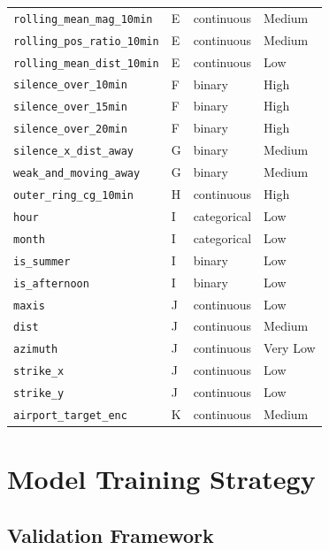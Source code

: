 \documentclass[12pt,a4paper]{article}
\begin{document}
\begin{table}[H]
\begin{tabular}{llll}
\texttt{rolling\_mean\_mag\_10min}  & E & continuous & Medium \\
\texttt{rolling\_pos\_ratio\_10min} & E & continuous & Medium \\
\texttt{rolling\_mean\_dist\_10min} & E & continuous & Low \\
\texttt{silence\_over\_10min}     & F & binary     & High \\
\texttt{silence\_over\_15min}     & F & binary     & High \\
\texttt{silence\_over\_20min}     & F & binary     & High \\
\texttt{silence\_x\_dist\_away}   & G & binary     & Medium \\
\texttt{weak\_and\_moving\_away}  & G & binary     & Medium \\
\texttt{outer\_ring\_cg\_10min}   & H & continuous & High \\
\texttt{hour}                     & I & categorical & Low \\
\texttt{month}                    & I & categorical & Low \\
\texttt{is\_summer}               & I & binary     & Low \\
\texttt{is\_afternoon}            & I & binary     & Low \\
\texttt{maxis}                    & J & continuous & Low \\
\texttt{dist}                     & J & continuous & Medium \\
\texttt{azimuth}                  & J & continuous & Very Low \\
\texttt{strike\_x}                & J & continuous & Low \\
\texttt{strike\_y}                & J & continuous & Low \\
\texttt{airport\_target\_enc}     & K & continuous & Medium \\
\bottomrule
\end{tabular}
\end{table}

\section{Model Training Strategy}

\subsection{Validation Framework}
\end{document}

